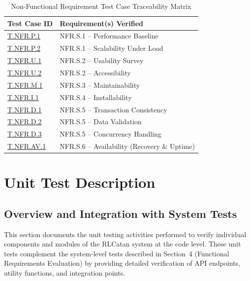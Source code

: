 \documentclass[12pt, titlepage]{article}
\begin{document}
\begin{table}[H]
  \centering
  \caption{Non-Functional Requirement Test Case Traceability Matrix}
  \label{tab:nfr-system-test-traceability}
  \begin{tabularx}{\textwidth}{|l|X|}
    \hline
    \textbf{Test Case ID} & \textbf{Requirement(s) Verified} \\ \hline
    \hyperlink{T.NFR.P.1}{T.NFR.P.1}   & NFR.S.1 -- Performance Baseline \\ \hline
    \hyperlink{T.NFR.P.2}{T.NFR.P.2}   & NFR.S.1 -- Scalability Under Load \\ \hline %
    \hyperlink{T.NFR.U.1}{T.NFR.U.1}   & NFR.S.2 -- Usability Survey \\ \hline
    \hyperlink{T.NFR.U.2}{T.NFR.U.2}   & NFR.S.2 -- Accessibility \\ \hline
    \hyperlink{T.NFR.M.1}{T.NFR.M.1}   & NFR.S.3 -- Maintainability \\ \hline
    \hyperlink{T.NFR.I.1}{T.NFR.I.1}   & NFR.S.4 -- Installability \\ \hline
    \hyperlink{T.NFR.D.1}{T.NFR.D.1}   & NFR.S.5 -- Transaction Consistency \\ \hline
    \hyperlink{T.NFR.D.2}{T.NFR.D.2}   & NFR.S.5 -- Data Validation \\ \hline
    \hyperlink{T.NFR.D.3}{T.NFR.D.3}   & NFR.S.5 -- Concurrency Handling \\ \hline
    \hyperlink{T.NFR.AV.1}{T.NFR.AV.1}  & NFR.S.6 -- Availability (Recovery \& Uptime) \\ \hline
  \end{tabularx}
\end{table}


\section{Unit Test Description}

\subsection{Overview and Integration with System Tests}

This section documents the unit testing activities performed to verify individual components and modules of the RLCatan system at the code level. These unit tests complement the system-level tests described in Section~4 (Functional Requirements Evaluation) by providing detailed verification of API endpoints, utility functions, and integration points.
\end{document}
